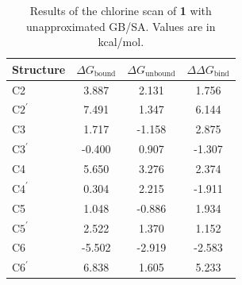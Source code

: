 \documentclass[12pt]{report}
\begin{document}
\vspace*{0.3cm}
\begin{table}[ht]
\centering
\caption{Results of the chlorine scan of \textbf{1} with unapproximated GB/SA. Values are in kcal/mol.}
\begin{tabular}{lSSS}
\toprule
Structure & $\Delta G_\textrm{bound}$ & $\Delta G_\textrm{unbound}$ & $\Delta\Delta G_\textrm{bind}$ \\
\midrule
\hspace*{.6cm}C2        & 3.887            & 2.131              & 1.756\\
\hspace*{.6cm}C$2^\prime$       & 7.491            & 1.347              & 6.144\\
\hspace*{.6cm}C3        & 1.717            & -1.158           & 2.875\\
\hspace*{.6cm}C$3^\prime$       & -0.400         & 0.907              & -1.307\\
\hspace*{.6cm}C4        & 5.650            & 3.276              & 2.374\\
\hspace*{.6cm}C$4^\prime$       & 0.304            & 2.215              & -1.911\\
\hspace*{.6cm}C5        & 1.048            & -0.886           & 1.934\\
\hspace*{.6cm}C$5^\prime$       & 2.522            & 1.370              & 1.152\\
\hspace*{.6cm}C6        & -5.502         & -2.919           & -2.583\\
\hspace*{.6cm}C$6^\prime$       & 6.838            & 1.605              & 5.233\\
\bottomrule
\end{tabular}
\label{scandatarigorous}
\end{table}
\end{document}
